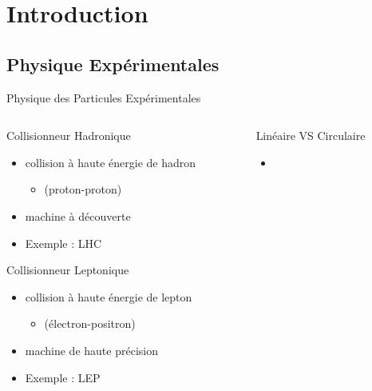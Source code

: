 \documentclass[9pt]{beamer}
\begin{document}
\section{Introduction}

\subsection{Physique Expérimentales}

\begin{frame}{Physique des Particules Expérimentales}

	\begin{columns}
	\begin{column}{0.45\textwidth}

	\begin{block}{Collisionneur Hadronique}
		\begin{itemize}
			\item collision à haute énergie de hadron 
			\begin{itemize}
				\item (proton-proton)
			\end{itemize}
			\item machine à découverte 
			\item Exemple : LHC 
		\end{itemize}
	\end{block}
	
	\begin{block}{Collisionneur Leptonique}
		\begin{itemize}
			\item collision à haute énergie de lepton
			\begin{itemize}
				\item (électron-positron)
			\end{itemize}
			\item machine de haute précision
			\item Exemple : LEP 
		\end{itemize}
	\end{block}
	
	\end{column}
	\begin{column}{0.45\textwidth}
	
	\begin{block}{Linéaire VS Circulaire}
		\begin{itemize}
			\item 
		\end{itemize}
	\end{block}
	
	\end{column}
	\end{columns}
	
\end{frame}
\end{document}
